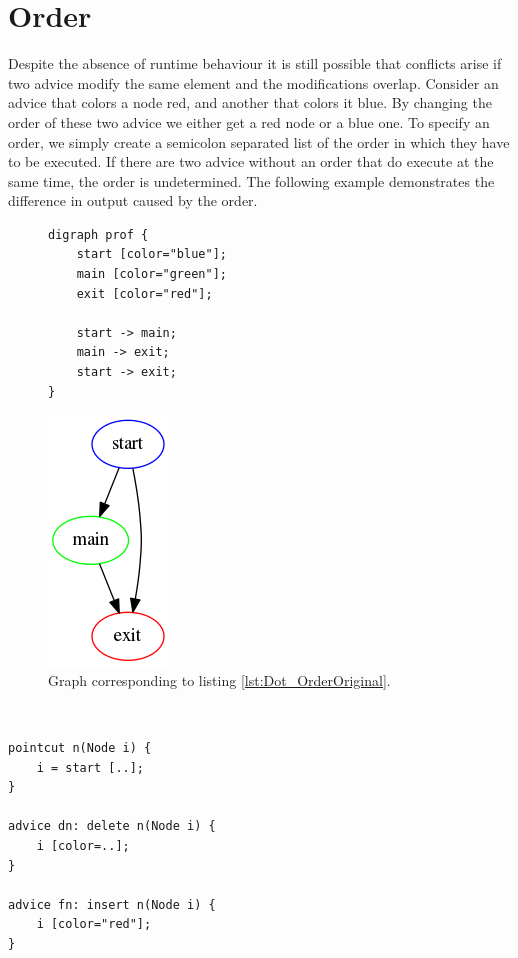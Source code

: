 \documentclass[a4paper]{report}
\begin{document}
\section{Order}
Despite the absence of runtime behaviour it is still possible that conflicts arise if two advice modify the same element and the modifications overlap. Consider an advice that colors a node red, and another that colors it blue. By changing the order of these two advice we either get a red node or a blue one. To specify an order, we simply create a semicolon separated list of the order in which they have to be executed. If there are two advice without an order that do execute at the same time, the order is undetermined. The following example demonstrates the difference in output caused by the order.\\
\begin{figure}[h!]
\vspace{-20pt}
\centering
\begin{minipage}{0.45\textwidth}
\begin{lstlisting}[caption=The source code., label=lst:Dot_OrderOriginal]
digraph prof {
	start [color="blue"];
	main [color="green"];
	exit [color="red"];

	start -> main;
	main -> exit;
	start -> exit;
}
\end{lstlisting}
\end{minipage}
\begin{minipage}{0.45\textwidth}
\centering
\includegraphics[scale=0.5]{images/AOFDot/Original.png}
\caption{Graph corresponding to listing \ref{lst:Dot_OrderOriginal}.}
\end{minipage}
\end{figure}
\vspace{-20pt}
\\
\begin{lstlisting}[multicols=2,caption=An example of the order., label=lst:Dot_Order]
pointcut n(Node i) {
	i = start [..];
}

advice dn: delete n(Node i) {
	i [color=..];
}

advice fn: insert n(Node i) {
	i [color="red"];
}
\end{lstlisting}
\end{document}
